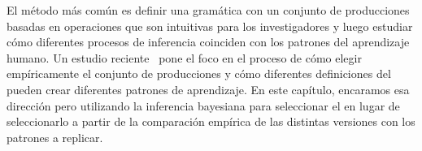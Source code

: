 
El método más común es definir una gramática con un conjunto de producciones basadas en operaciones que son intuitivas para los investigadores y luego estudiar cómo diferentes procesos de inferencia coinciden con los patrones del aprendizaje humano. Un estudio reciente~\cite{piantadosi2016logical} pone el foco en el proceso de cómo elegir empíricamente el conjunto de producciones y cómo diferentes definiciones del \lot pueden crear diferentes patrones de aprendizaje. En este capítulo, encaramos esa dirección pero utilizando la inferencia bayesiana para seleccionar el \lot en lugar de seleccionarlo a partir de la comparación empírica de las distintas versiones con los patrones a replicar.



